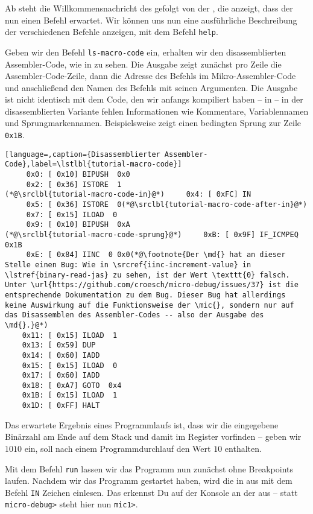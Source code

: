 Ab  steht die Willkommensnachricht des \md{} gefolgt von der , die anzeigt, dass der \md{} nun einen Befehl erwartet. Wir können uns nun eine ausführliche Beschreibung der verschiedenen Befehle anzeigen, mit dem Befehl \texttt{help}.

Geben wir den Befehl \texttt{ls-macro-code} ein, erhalten wir den disassemblierten Assembler-Code, wie in  zu sehen. Die Ausgabe zeigt zunächst pro Zeile die Assembler-Code-Zeile, dann die Adresse des Befehls im Mikro-Assembler-Code und anschließend den Namen des Befehls mit seinen Argumenten. Die Ausgabe ist nicht identisch mit dem Code, den wir anfangs kompiliert haben -- in  -- in der disassemblierten Variante fehlen Informationen wie Kommentare, Variablennamen und Sprungmarkennamen. Beispielsweise zeigt  einen bedingten Sprung zur Zeile \texttt{0x1B}.

\begin{lstlisting}[language=,caption={Disassemblierter Assembler-Code},label=\lstlbl{tutorial-macro-code}]
     0x0: [ 0x10] BIPUSH  0x0
     0x2: [ 0x36] ISTORE  1
(*@\srclbl{tutorial-macro-code-in}@*)     0x4: [ 0xFC] IN 
     0x5: [ 0x36] ISTORE  0(*@\srclbl{tutorial-macro-code-after-in}@*)
     0x7: [ 0x15] ILOAD  0
     0x9: [ 0x10] BIPUSH  0xA
(*@\srclbl{tutorial-macro-code-sprung}@*)     0xB: [ 0x9F] IF_ICMPEQ  0x1B
     0xE: [ 0x84] IINC  0 0x0(*@\footnote{Der \md{} hat an dieser Stelle einen Bug: Wie in \srcref{iinc-increment-value} in \lstref{binary-read-jas} zu sehen, ist der Wert \texttt{0} falsch. Unter \url{https://github.com/croesch/micro-debug/issues/37} ist die entsprechende Dokumentation zu dem Bug. Dieser Bug hat allerdings keine Auswirkung auf die Funktionsweise der \mic{}, sondern nur auf das Disassemblen des Assembler-Codes -- also der Ausgabe des \md{}.}@*)
    0x11: [ 0x15] ILOAD  1
    0x13: [ 0x59] DUP 
    0x14: [ 0x60] IADD 
    0x15: [ 0x15] ILOAD  0
    0x17: [ 0x60] IADD 
    0x18: [ 0xA7] GOTO  0x4
    0x1B: [ 0x15] ILOAD  1
    0x1D: [ 0xFF] HALT 
\end{lstlisting}

Das erwartete Ergebnis eines Programmlaufs ist, dass wir die eingegebene Binärzahl am Ende auf dem Stack und damit im Register  vorfinden -- geben wir $1010$ ein, soll  nach einem Programmdurchlauf den Wert $10$ enthalten.

Mit dem Befehl \texttt{run} lassen wir das Programm nun zunächst ohne Breakpoints laufen. Nachdem wir das Programm gestartet haben, wird die \mic{} in  aus  mit dem Befehl \texttt{IN} Zeichen einlesen. Das erkennst Du auf der Konsole an der  aus  -- statt \texttt{micro-debug>} steht hier nun \texttt{mic1>}.

